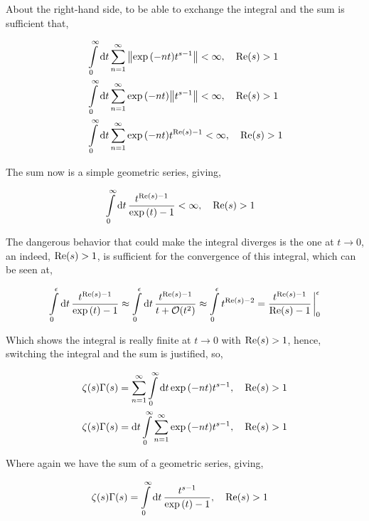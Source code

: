 About the right-hand side, to be able to exchange the integral and the sum is sufficient that,

\begin{align*}
    &\int\limits_0^\infty\dd{t}\sum\limits_{n=1}^\infty\norm{\exp\qty(-nt)t^{s-1}}<\infty,\ \ \ \textnormal{Re}\qty(s)>1\\
    &\int\limits_0^\infty\dd{t}\sum\limits_{n=1}^\infty\exp\qty(-nt)\norm{t^{s-1}}<\infty,\ \ \ \textnormal{Re}\qty(s)>1\\
    &\int\limits_0^\infty\dd{t}\sum\limits_{n=1}^\infty\exp\qty(-nt)t^{\textnormal{Re}\qty(s)-1}<\infty,\ \ \ \textnormal{Re}\qty(s)>1
\end{align*}

The sum now is a simple geometric series, giving,

\begin{align*}
    &\int\limits_0^\infty\dd{t}\frac{t^{\textnormal{Re}\qty(s)-1}}{\exp\qty(t)-1}<\infty,\ \ \ \textnormal{Re}\qty(s)>1
\end{align*}

The dangerous behavior that could make the integral diverges is the one at $t\rightarrow0$, an indeed, $\textnormal{Re}\qty(s)>1$, is 
sufficient for the convergence of this integral, which can be seen at,

\begin{align*}
    \int\limits_0^\epsilon\dd{t}\frac{t^{\textnormal{Re}\qty(s)-1}}{\exp\qty(t)-1}\approx\int\limits_0^\epsilon\dd{t}\frac{t^{\textnormal{Re}\qty(s)-1}}{t+\mathcal O\qty(t^2)}\approx\int\limits_0^\epsilon t^{\textnormal{Re}\qty(s)-2}=\frac{t^{\textnormal{Re}\qty(s)-1}}{\textnormal{Re}\qty(s)-1}\eval_0^\epsilon
\end{align*}

Which shows the integral is really finite at $t\rightarrow 0$ with $\textnormal{Re}\qty(s)>1$, hence, switching the integral and the 
sum is justified, so,

\begin{align*}
    \zeta(s)\Gamma\qty(s)&=\sum\limits_{n=1}^\infty\int\limits_0^\infty\dd{t}\exp\qty(-nt)t^{s-1},\ \ \ \textnormal{Re}\qty(s)>1\\
    \zeta(s)\Gamma\qty(s)&=\dd{t}\int\limits_0^\infty\sum\limits_{n=1}^\infty\exp\qty(-nt)t^{s-1},\ \ \ \textnormal{Re}\qty(s)>1
\end{align*}

Where again we have the sum of a geometric series, giving,

\begin{align*}
    \zeta(s)\Gamma\qty(s)&=\int\limits_0^\infty\dd{t}\frac{t^{s-1}}{\exp\qty(t)-1},\ \ \ \textnormal{Re}\qty(s)>1
\end{align*}

